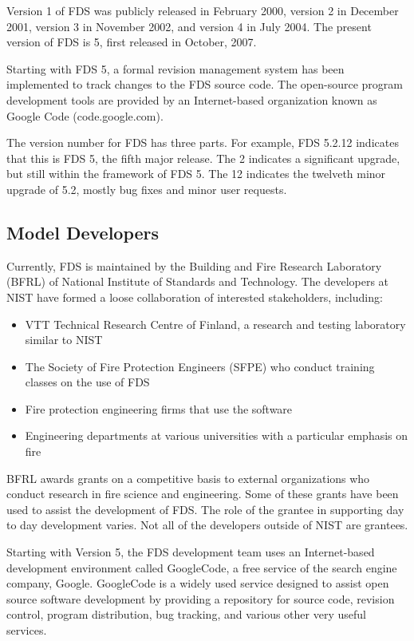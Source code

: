 \documentclass[11pt]{book}
\begin{document}
Version 1 of FDS was publicly released in February 2000, version 2 in December 2001, version 3 in November 2002, and version 4 in July 2004. The
present version of FDS is 5, first released in October, 2007.

Starting with FDS 5, a formal revision management system has been implemented to track changes to the FDS source code. The open-source program
development tools are provided by an Internet-based organization known as Google Code (code.google.com).

The version number for FDS has three parts.  For example, FDS 5.2.12 indicates that this is FDS 5, the fifth major release. The 2 indicates a
significant upgrade, but still within the framework of FDS 5.  The 12 indicates the twelveth minor upgrade of 5.2, mostly bug fixes and minor user
requests.


\subsection{Model Developers}


Currently, FDS is maintained by the Building and Fire Research Laboratory (BFRL) of National Institute of Standards and Technology. The developers at
NIST have formed a loose collaboration of interested stakeholders, including:
\begin{itemize}
\item VTT Technical Research Centre of Finland, a research and testing
laboratory similar to NIST
\item The Society of Fire Protection Engineers (SFPE) who conduct training classes on the use of FDS
\item Fire protection engineering firms that use the software
\item Engineering departments at various universities with a particular emphasis on fire
\end{itemize}
BFRL awards grants on a competitive basis to external organizations who conduct research in fire science and engineering. Some of these grants have
been used to assist the development of FDS. The role of the grantee in supporting day to day development varies. Not all of the developers outside of
NIST are grantees.

Starting with Version 5, the FDS development team uses an Internet-based development environment called GoogleCode, a free service of the search
engine company, Google. GoogleCode is a widely used service designed to assist open source software development by providing a repository for source
code, revision control, program distribution, bug tracking, and various other very useful services.
\end{document}
